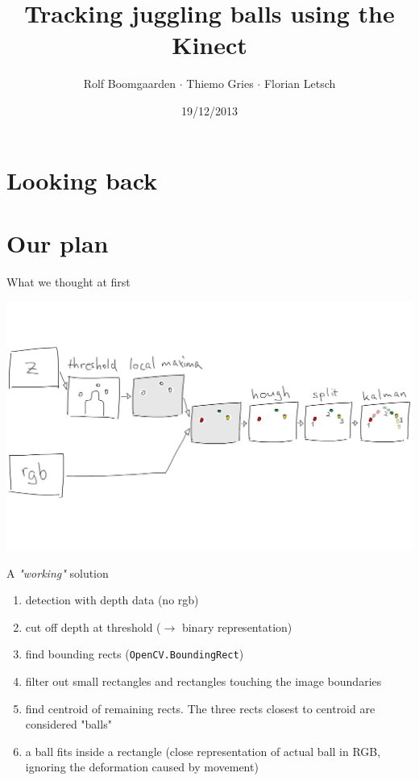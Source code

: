 \documentclass{beamer}
\title{Tracking juggling balls using the Kinect}
\author[Rolf $\cdot$ Thiemo $\cdot$ Flo]{Rolf Boomgaarden $\cdot$ Thiemo Gries $\cdot$ Florian Letsch}
\institute{Universität Hamburg}
\date{19/12/2013}
\begin{document}
\frame
{
\titlepage
}
\section{Looking back}

\section{Our plan}
\begin{frame}{What we thought at first}
\begin{center}\includegraphics[scale=0.1]{img/flowchart.png}\end{center}
\end{frame}

\begin{frame}{A \textit{"working"} solution}
\begin{enumerate}
	\item detection with depth data (no rgb)
	\item cut off depth at threshold ($\rightarrow$ binary representation)
	\item find bounding rects (\lstinline{OpenCV.BoundingRect})
	\item filter out small rectangles and rectangles touching the image boundaries
	\item find centroid of remaining rects. The three rects closest to centroid are considered "balls"
	\item a ball fits inside a rectangle (close representation of actual ball in RGB, ignoring the deformation caused by movement)
\end{enumerate}
\end{frame}
\end{document}
